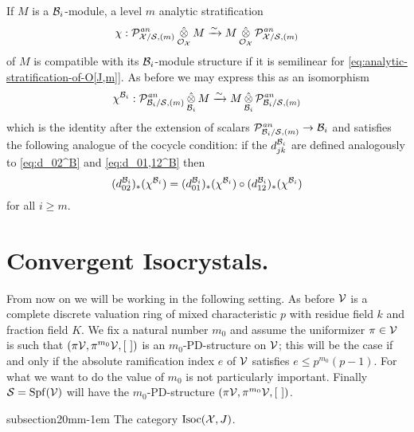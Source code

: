 \documentclass{article}
\makeatletter
\theoremstyle{change}
\renewcommand{\subsection}{\@startsection%
{subsection}{2}{0mm}{\baselineskip}{-1em}%
{\normalfont\normalsize\bfseries}}
\numberwithin{equation}{subsubsection}
\makeatother
\begin{document}
If $M$ is a ${\cal B}_i$-module, a level $m$ analytic stratification
\begin{displaymath}
  \chi:{\cal P}^{\mathit{an}}_{{\cal X}/{\cal S},(m)}\mathop{\hat\otimes}_{{\cal O}_{\cal X}}M\xrightarrow{\sim} M\mathop{\hat\otimes}_{{\cal O}_{\cal X}}{\cal P}^{\mathit{an}}_{{\cal X}/{\cal S},(m)}  
\end{displaymath}
of $M$ is compatible with its ${\cal B}_i$-module structure if it is
semilinear for \ref{eq:analytic-stratification-of-O[J,m]}. As before we
may express this as an isomorphism
\begin{equation}
  \label{eq:analytic-stratification-coefficients}
  \chi^{{\cal B}_i}:
{\cal P}^{\mathit{an}}_{{\cal B}_i/{\cal S},(m)}\mathop{\hat\otimes}_{{\cal B}_i}M\xrightarrow{\sim} M\mathop{\hat\otimes}_{{\cal B}_i}{\cal P}^{\mathit{an}}_{{\cal B}_i/{\cal S},(m)}
\end{equation}
which is the identity after the extension of scalars
${\cal P}^{\mathit{an}}_{{\cal B}_i/{\cal S},(m)}\to{\cal B}_i$ and satisfies the following analogue of the
cocycle condition: if the $d^{{\cal B}_i}_{jk}$ are defined analogously to 
\ref{eq:d_02^B} and \ref{eq:d_01,12^B} then
\begin{equation}
  \label{eq:analytic-cocycle-condition}
  (d^{{\cal B}_i}_{02})_*(\chi^{{\cal B}_i})=
  (d^{{\cal B}_i}_{01})_*(\chi^{{\cal B}_i})\circ(d^{{\cal B}_i}_{12})_*(\chi^{{\cal B}_i})
\end{equation}
for all $i\ge m$.

\section{Convergent Isocrystals.}
\label{sec:isocrystals}

From now on we will be working in the following setting. As before
${\cal V}$ is a complete discrete valuation ring of mixed characteristic $p$
with residue field $k$ and fraction field $K$.  We fix a natural
number $m_0$ and assume the uniformizer $\pi\in{\cal V}$ is such that
$(\pi{\cal V},\pi^{m_0}{\cal V},[\ ])$ is an $m_0$-PD-structure on ${\cal V}$; this will
be the case if and only if the absolute ramification index $e$ of ${\cal V}$
satisfies $e\le p^{m_0}(p-1)$. For what we want to do the value of
$m_0$ is not particularly important. Finally ${\cal S}={\operatorname{Spf}({{\cal V}})}$ will have
the $m_0$-PD-structure $(\pi{\cal V},\pi^{m_0}{\cal V},[\ ])$.

\subsection{The category $\mathrm{Isoc}({\cal X},J)$.}
\label{sec:convergent-isocrystals}
\end{document}
